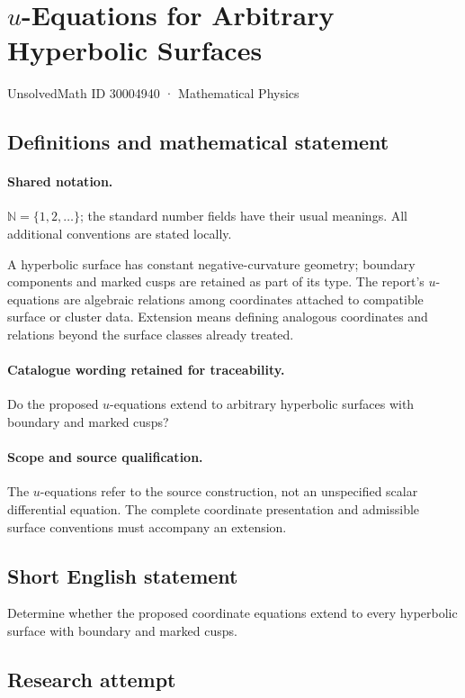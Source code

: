 \documentclass[11pt]{article}
\begin{document}
\setcounter{section}{30004939}
\section{$u$-Equations for Arbitrary Hyperbolic Surfaces}\label{30004940}
{\small UnsolvedMath ID 30004940 · Mathematical Physics}
\subsection{Definitions and mathematical statement}

\paragraph{Shared notation.}$\mathbb N=\{1,2,\ldots\}$; the standard number fields have their usual meanings. All additional conventions are stated locally.


A hyperbolic surface has constant negative-curvature geometry; boundary components and marked cusps are retained as part of its type. The report's $u$-equations are algebraic relations among coordinates attached to compatible surface or cluster data. Extension means defining analogous coordinates and relations beyond the surface classes already treated.

\paragraph{Catalogue wording retained for traceability.}
Do the proposed $u$-equations extend to arbitrary hyperbolic surfaces with boundary and marked cusps?

\paragraph{Scope and source qualification.}The $u$-equations refer to the source construction, not an unspecified scalar differential equation. The complete coordinate presentation and admissible surface conventions must accompany an extension.
\subsection{Short English statement}
Determine whether the proposed coordinate equations extend to every hyperbolic surface with boundary and marked cusps.
\subsection{Research attempt}
\end{document}
